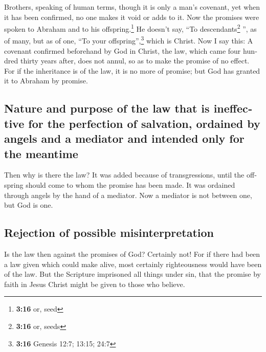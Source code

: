 \begin{paracol}{2}
\begin{otherlanguage}{english}
 Brothers, speaking of human terms, though it is only a
man's covenant, yet when it has been confirmed, no one makes it void or
adds to it.  Now the promises were spoken to Abraham and
to his offspring.\footnote{\textbf{3:16} or, seed} He doesn't say, ``To
descendants\footnote{\textbf{3:16} or, seeds} '', as of many, but as of
one, ``To your offspring'',\footnote{\textbf{3:16} Genesis 12:7; 13:15;
  24:7} which is Christ.  Now I say this: A covenant
confirmed beforehand by God in Christ, the law, which came four hundred
thirty years after, does not annul, so as to make the promise of no
effect.  For if the inheritance is of the law, it is no
more of promise; but God has granted it to Abraham by promise.

\hypertarget{nature-and-purpose-of-the-law-that-is-ineffective-for-the-perfection-of-salvation-ordained-by-angels-and-a-mediator-and-intended-only-for-the-meantime}{%
\subsection{Nature and purpose of the law that is ineffective for the
perfection of salvation, ordained by angels and a mediator and intended
only for the
meantime}\label{nature-and-purpose-of-the-law-that-is-ineffective-for-the-perfection-of-salvation-ordained-by-angels-and-a-mediator-and-intended-only-for-the-meantime}}

 Then why is there the law? It was added because of
transgressions, until the offspring should come to whom the promise has
been made. It was ordained through angels by the hand of a mediator.
 Now a mediator is not between one, but God is one.

\hypertarget{rejection-of-possible-misinterpretation}{%
\subsection{Rejection of possible
misinterpretation}\label{rejection-of-possible-misinterpretation}}

 Is the law then against the promises of God? Certainly
not! For if there had been a law given which could make alive, most
certainly righteousness would have been of the law.  But
the Scripture imprisoned all things under sin, that the promise by faith
in Jesus Christ might be given to those who believe.

\hypertarget{the-external-educational-purpose-of-the-law}{%
}
\end{otherlanguage}
\end{paracol}
